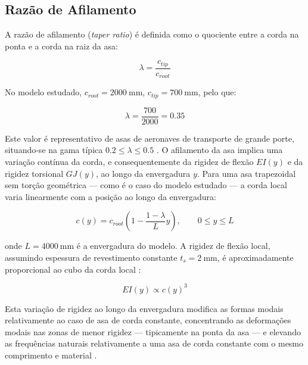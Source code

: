 \documentclass[11pt,twoside,a4paper]{report}
\begin{document}
\subsection{Razão de Afilamento}

A razão de afilamento (\textit{taper ratio}) é definida como o quociente entre a corda na ponta e a corda na raiz da asa:

\begin{equation}
    \lambda = \frac{c_{tip}}{c_{root}}
    \label{eq:taper_ratio}
\end{equation}

No modelo estudado, $c_{root} = \SI{2000}{\milli\meter}$, 
$c_{tip} = \SI{700}{\milli\meter}$, pelo que:

\begin{equation}
    \lambda = \frac{700}{2000} = 0.35
    \label{eq:taper_ratio_an124}
\end{equation}

Este valor é representativo de asas de aeronaves de transporte de grande porte, situando-se na gama típica $0.2 \leq \lambda \leq 0.5$ \cite{Raymer2018}. O afilamento da asa implica uma variação contínua da corda, e consequentemente da rigidez de flexão $EI(y)$ e da rigidez torsional $GJ(y)$, ao longo da envergadura $y$. Para uma asa trapezoidal sem torção geométrica --- como é o caso do modelo estudado --- a corda local varia linearmente com a posição ao longo da envergadura:

\begin{equation}
    c(y) = c_{root}\left(1 - \frac{1-\lambda}{L}y\right), 
    \qquad 0 \leq y \leq L
    \label{eq:corda_local}
\end{equation}

\noindent onde $L = \SI{4000}{\milli\meter}$ é a envergadura do modelo. A rigidez de flexão local, assumindo espessura de revestimento constante $t_s = \SI{2}{\milli\meter}$, é aproximadamente proporcional ao cubo da corda local \cite{Megson2012}:

\begin{equation}
    EI(y) \propto c(y)^3
    \label{eq:EI_local}
\end{equation}

Esta variação de rigidez ao longo da envergadura modifica as formas modais relativamente ao caso de asa de corda constante, concentrando as deformações modais nas zonas de menor rigidez --- tipicamente na ponta da asa --- e elevando as frequências naturais relativamente a uma asa de corda constante com o mesmo comprimento e material \cite{Rao2011}.
\end{document}
